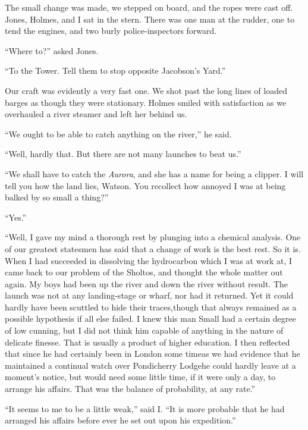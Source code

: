 \documentclass[12pt,english,oneside]{book}
\begin{document}
The small change was made, we stepped on board, and the ropes were
cast off. Jones, Holmes, and I sat in the stern. There was one man
at the rudder, one to tend the engines, and two burly police-inspectors
forward.

{}``Where to?'' asked Jones.

{}``To the Tower. Tell them to stop opposite Jacobson's Yard.''

Our craft was evidently a very fast one. We shot past the long lines
of loaded barges as though they were stationary. Holmes smiled with
satisfaction as we overhauled a river steamer and left her behind
us.

{}``We ought to be able to catch anything on the river,'' he said.

{}``Well, hardly that. But there are not many launches to beat us.''

{}``We shall have to catch the \emph{Aurora}, and she has a name
for being a clipper. I will tell you how the land lies, Watson. You
recollect how annoyed I was at being balked by so small a thing?''

{}``Yes.''

{}``Well, I gave my mind a thorough rest by plunging into a chemical
analysis. One of our greatest statesmen has said that a change of
work is the best rest. So it is. When I had succeeded in dissolving
the hydrocarbon which I was at work at, I came back to our problem
of the Sholtos, and thought the whole matter out again. My boys had
been up the river and down the river without result. The launch was
not at any landing-stage or wharf, nor had it returned. Yet it could
hardly have been scuttled to hide their traces,\mdsh{---}though that
always remained as a possible hypothesis if all else failed. I knew
this man Small had a certain degree of low cunning, but I did not
think him capable of anything in the nature of delicate finesse. That
is usually a product of higher education. I then reflected that since
he had certainly been in London some time\mdsh{---}as we had evidence
that he maintained a continual watch over Pondicherry Lodge\mdsh{---}he
could hardly leave at a moment's notice, but would need some little
time, if it were only a day, to arrange his affairs. That was the
balance of probability, at any rate.''

{}``It seems to me to be a little weak,'' said I. {}``It is more
probable that he had arranged his affairs before ever he set out upon
his expedition.''
\end{document}
